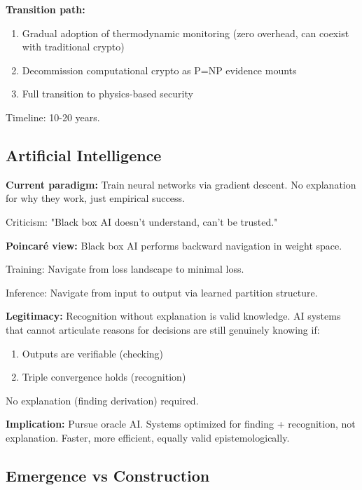 \documentclass[twocolumn,10pt]{article}
\theoremstyle{definition}
\theoremstyle{remark}
\begin{document}
\vspace{0.2cm}
\noindent\textbf{Transition path:}
\begin{enumerate}
\item Gradual adoption of thermodynamic monitoring (zero overhead, can coexist with traditional crypto)
\item Decommission computational crypto as P=NP evidence mounts
\item Full transition to physics-based security
\end{enumerate}

Timeline: 10-20 years.

\subsection{Artificial Intelligence}

\textbf{Current paradigm:} Train neural networks via gradient descent. No explanation for why they work, just empirical success.

Criticism: "Black box AI doesn't understand, can't be trusted."

\vspace{0.2cm}
\noindent\textbf{Poincaré view:} Black box AI performs backward navigation in weight space.

Training: Navigate from loss landscape to minimal loss.

Inference: Navigate from input to output via learned partition structure.

\vspace{0.2cm}
\noindent\textbf{Legitimacy:} Recognition without explanation is valid knowledge. AI systems that cannot articulate reasons for decisions are still genuinely knowing if:
\begin{enumerate}
\item Outputs are verifiable (checking)
\item Triple convergence holds (recognition)
\end{enumerate}

No explanation (finding derivation) required.

\vspace{0.2cm}
\noindent\textbf{Implication:} Pursue oracle AI. Systems optimized for finding + recognition, not explanation. Faster, more efficient, equally valid epistemologically.

\subsection{Emergence vs Construction}
\end{document}
